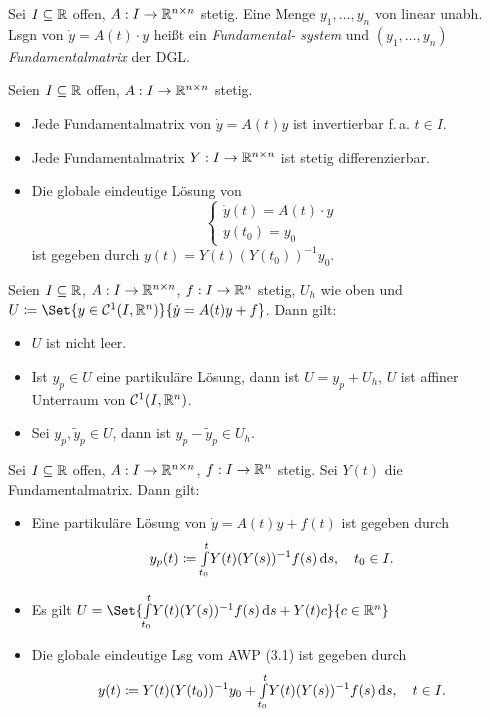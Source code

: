 \documentclass{cheat-sheet}
\begin{document}

\begin{defn}
  Sei $I \subseteq \mathbb{R}$ offen, $A : I \to \mathbb{R}^{n \times n}$ stetig. Eine Menge $y_1, \ldots, y_n$ von linear unabh. Lsgn von $\dot{y} = A(t) \cdot y$ heißt ein \emph{Fundamental- system} und $(y_1, \ldots, y_n)$ \emph{Fundamentalmatrix} der DGL.
\end{defn}

\begin{satz}
  Seien $I \subseteq \mathbb{R}$ offen, $A : I \to \mathbb{R}^{n \times n}$ stetig.
  \begin{itemize}
    \item Jede Fundamentalmatrix von $\dot{y} = A(t) y$ ist invertierbar f.\,a. $t \in I$.
    \item Jede Fundamentalmatrix $Y : I \to \mathbb{R}^{n \times n}$ ist stetig differenzierbar.
    \item Die globale eindeutige Lösung von
    \[
      \left\{ \begin{array}{l}
        \dot{y}(t) = A(t) \cdot y\\
        y(t_0) = y_0
        \end{array}
      \right.
    \]
    ist gegeben durch $y(t) = Y(t) \left( Y(t_0) \right)^{-1} y_0$.
  \end{itemize}
\end{satz}

\begin{satz}%
  Seien $I \subseteq \mathbb{R}$, $A : I \to \mathbb{R}^{n \times n}$, $f : I \to \mathbb{R}^n$ stetig, $U_h$ wie oben und $U \coloneqq \Set{ y \in \mathcal{C}^1(I, \R^n) }{ \dot{y} = A(t) y + f }$. Dann gilt:
  \begin{itemize}
    \item $U$ ist nicht leer.
    \item Ist $y_p \in U$ eine partikuläre Lösung, dann ist $U = y_p + U_h$, \dh{} $U$ ist affiner Unterraum von $\mathcal{C}^1(I, \mathbb{R}^n)$.
    \item Sei $y_p, \tilde{y}_p \in U$, dann ist $y_p - \tilde{y}_p \in U_h$.
  \end{itemize}
\end{satz}

\begin{satz}
  Sei $I \subseteq \mathbb{R}$ offen, $A : I \to \mathbb{R}^{n \times n}$, $f : I \to \mathbb{R}^n$ stetig. Sei $Y(t)$ die Fundamentalmatrix. Dann gilt:
  \begin{itemize}
    \item Eine partikuläre Lösung von $\dot{y} = A(t) y + f(t)$ ist gegeben durch
    \[ y_p(t) \coloneqq {\textstyle \int\limits_{t_0}^{t}} Y(t) (Y(s))^{-1} f(s) \,\mathrm{d} s, \quad t_0 \in I. \]
    \item Es gilt $U = \Set{ \Int{t_0}{t}{Y(t) (Y(s))^{-1} f(s)}{s} + Y(t) c }{ c \in \R^n }$
    \item Die globale eindeutige Lsg vom AWP (3.1) ist gegeben durch
    \[ y(t) \coloneqq Y(t) (Y(t_0))^{-1} y_0 + {\textstyle \int\limits_{t_0}^{t}} Y(t) (Y(s))^{-1} f(s) \,\mathrm{d} s, \quad t \in I. \]
  \end{itemize}
\end{satz}
\end{document}
